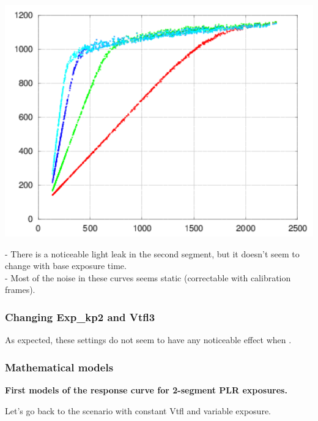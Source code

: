 \begin{center}
\includegraphics[height=10cm]{images/x-0-32-plr-vs-30ms-lin}
\end{center}

- There is a noticeable light leak in the second segment, but it doesn't seem to change with base exposure time.\\
- Most of the noise in these curves seems static (correctable with calibration frames). \\

\subsubsection{Changing Exp\_kp2 and Vtfl3}

As expected, these settings do not seem to have any noticeable effect when . 


\subsubsection{Mathematical models}

\textbf{First models of the response curve for 2-segment PLR exposures.}

Let's go back to the scenario with constant Vtfl and variable exposure. 

